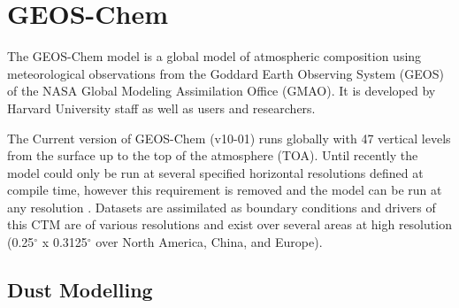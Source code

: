 \section{GEOS-Chem}
The GEOS-Chem model is a global model of atmospheric composition using meteorological observations from the Goddard Earth Observing System (GEOS) of the NASA Global Modeling Assimilation Office (GMAO). It is developed by Harvard University staff as well as users and researchers. 

The Current version of GEOS-Chem (v10-01) runs globally with 47 vertical levels from the surface up to the top of the atmosphere (TOA). 
Until recently the model could only be run at several specified horizontal resolutions defined at compile time, however this requirement is removed and the model can be run at any resolution \cite{Long_2015}.
Datasets are assimilated as boundary conditions and drivers of this CTM are of various resolutions and exist over several areas at high resolution (0.25$^{\circ}$ x 0.3125$^{\circ}$ over North America, China, and Europe).

\subsection{Dust Modelling}

  